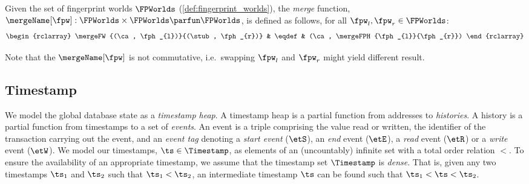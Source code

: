\begin{definition}
Given the set of fingerprint worlds $\FPWorlds$ (\ref{def:fingerprint_worlds}), the \emph{merge} function, $\mergeName[\fpw]: \FPWorlds \times \FPWorlds \parfun \FPWorlds$, is defined as follows, for all $\fpw_{l},\fpw_{r} \in \FPWorlds$:
\[
    \begin{rclarray}
	\mergeFW{(\ca, \fph_{l})}{(\stub, \fph_{r})} & \eqdef & (\ca, \mergeFPH{\fph_{l}}{\fph_{r}}) 
    \end{rclarray}
\]
\end{definition}

Note that the \( \mergeName[\fpw] \) is not commutative, i.e.\ swapping \( \fpw_{l}\) and \( \fpw_{r}\) might yield different result.

\subsection{Timestamp}

We model the global database state as a \emph{timestamp heap}. A timestamp heap is a partial function from addresses to \emph{histories}.
A history is a partial function from timestamps to a set of \emph{events}.
An event is a triple comprising the value read or written, the identifier of the transaction carrying out the event, and an \emph{event tag} denoting a \emph{start event} ($\etS$), an \emph{end} event ($\etE$), a \emph{read} event ($\etR$) or a \emph{write} event ($\etW$).
We model our timestamps, $\ts \in \Timestamp$, as elements of an (uncountably) infinite set with a total order relation $<$. To ensure the availability of an appropriate timestamp, we assume that the timestamp set $\Timestamp$ is \emph{dense}. That is, given any two timestamps $\ts_1$ and $\ts_2$ such that $\ts_1 < \ts_2$, an intermediate timestamp $\ts$ can be found such that $\ts_1 < \ts < \ts_2$.


